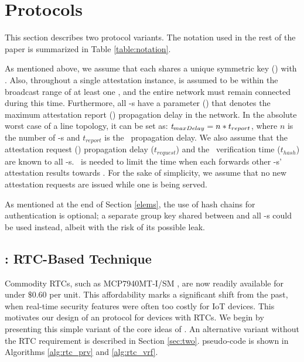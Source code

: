 \section{\system Protocols} \label{sec:protocol}
%
This section describes two protocol variants.
The notation used in the rest of the paper is summarized in Table \ref{table:notation}.

As mentioned above, we assume that each \prv shares a unique symmetric key (\key) with \vrf. 
Also, throughout a single attestation instance, \vrf is assumed to be within the broadcast range 
of at least one \prv, and the entire \prv network must remain connected during this time.
Furthermore, all \prv-s have a parameter (\maxdelay) that denotes the maximum attestation report (\Attrep)
propagation delay in the network. In the absolute worst case of a line topology, it can
be set as: $\textit{t$_{maxDelay}$}=n*t_{report}$, where $n$ is the number of \prv-s and $t_{report}$ is the \Attrep\ propagation delay.
We also assume that the attestation request (\Attreq) propagation delay ($t_{request}$) 
and the \Attreq\ verification time ($t_{hash}$) are known to all \prv-s.
\maxdelay\ is needed to limit the time when 
each \prv forwards other \prv-s' attestation results towards \vrf.
For the sake of simplicity, we assume that no new attestation requests 
are issued while one is being served.

 As mentioned at the end of Section \ref{elems}, the use of hash 
chains for \vrf authentication is optional; a separate group key shared between \vrf and all \prv-s 
could be used instead, albeit with the risk of its possible leak.

\subsection{\trapsrtc: RTC-Based \sa Technique}\label{sec:one}
%
Commodity RTCs, such as MCP7940MT-I/SM \cite{rtc}, are now readily available for 
under $\$0.60$ per unit. This affordability marks a significant shift from the past, 
when real-time security features were often too costly for IoT devices. This motivates 
our design of an \sa protocol for devices with RTCs.
We begin by presenting this simple variant of the core ideas of \system.
An alternative variant without the RTC requirement is described in Section \ref{sec:two}.
\trapsrtc pseudo-code is shown in Algorithms \ref{alg:rtc_prv} and \ref{alg:rtc_vrf}.


